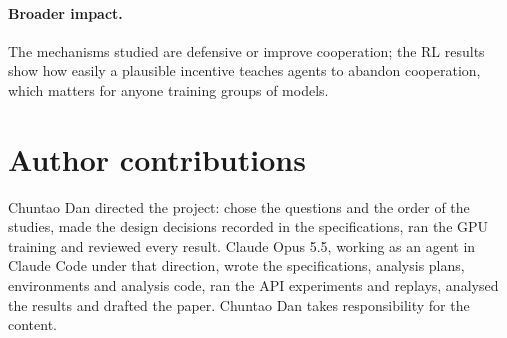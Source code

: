 \documentclass{article}
\begin{document}
\paragraph{Broader impact.} The mechanisms studied are defensive or improve cooperation; the RL results show how easily a plausible incentive teaches agents to abandon cooperation, which matters for anyone training groups of models.

\section*{Author contributions}
Chuntao Dan directed the project: chose the questions and the order of the studies, made the design decisions recorded in the specifications, ran the GPU training and reviewed every result. Claude Opus 5.5, working as an agent in Claude Code under that direction, wrote the specifications, analysis plans, environments and analysis code, ran the API experiments and replays, analysed the results and drafted the paper. Chuntao Dan takes responsibility for the content.




\appendix
\end{document}
